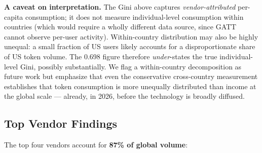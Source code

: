 \documentclass[11pt,a4paper]{article}
\begin{document}
\textbf{A caveat on interpretation.} The Gini above captures \emph{vendor-attributed} per-capita consumption; it does not measure individual-level consumption within countries (which would require a wholly different data source, since GATT cannot observe per-user activity). Within-country distribution may also be highly unequal: a small fraction of US users likely accounts for a disproportionate share of US token volume. The 0.698 figure therefore \emph{under}-states the true individual-level Gini, possibly substantially. We flag a within-country decomposition as future work but emphasize that even the conservative cross-country measurement establishes that token consumption is more unequally distributed than income at the global scale --- already, in 2026, before the technology is broadly diffused.

\subsection{Top Vendor Findings}

The top four vendors account for \textbf{87\% of global volume}:
\end{document}

